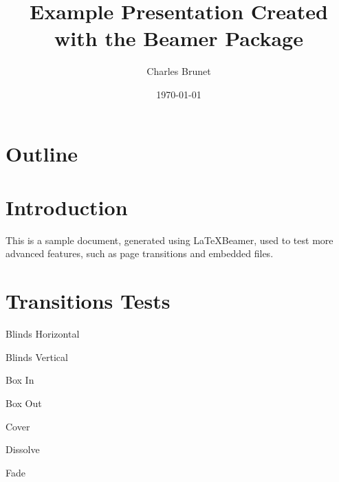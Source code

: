 \documentclass{beamer}
\title{Example Presentation Created with the Beamer Package}
\author{Charles Brunet}
\date{\today}
\begin{document}
\begin{frame}
    \titlepage
\end{frame}

\section*{Outline}

\begin{frame}
    \tableofcontents
\end{frame}

\section{Introduction}

\begin{frame}

    This is a sample document, generated using \LaTeX Beamer,
    used to test more advanced features, such as page transitions
    and embedded files.

\end{frame}

\section{Transitions Tests}

\begin{frame}
    \transblindshorizontal[duration=0]
    Blinds Horizontal
\end{frame}

\begin{frame}
    \transblindsvertical
    Blinds Vertical
\end{frame}

\begin{frame}
    \transboxin[duration=1]
    Box In
\end{frame}

\begin{frame}
    \transboxout[duration=2]
    Box Out
\end{frame}

\begin{frame}
    \transcover[direction=0, duration=15]
    Cover
\end{frame}

\begin{frame}
    \transdissolve
    Dissolve
\end{frame}

\begin{frame}
    \transfade
    Fade
\end{frame}
\end{document}
